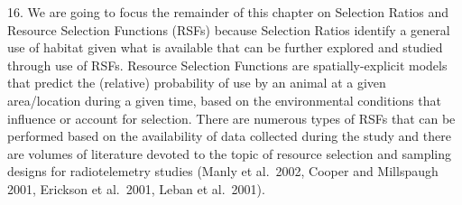 \documentclass[
  letterpaper,
]{book}
\newenvironment{Shaded}{\begin{snugshade}}{\end{snugshade}}
\newcommand{\CommentTok}[1]{\textcolor[rgb]{0.37,0.37,0.37}{#1}}
\newcommand{\DecValTok}[1]{\textcolor[rgb]{0.68,0.00,0.00}{#1}}
\newcommand{\FunctionTok}[1]{\textcolor[rgb]{0.28,0.35,0.67}{#1}}
\newcommand{\NormalTok}[1]{\textcolor[rgb]{0.00,0.23,0.31}{#1}}
\newcommand{\OtherTok}[1]{\textcolor[rgb]{0.00,0.23,0.31}{#1}}
\newcommand{\SpecialCharTok}[1]{\textcolor[rgb]{0.37,0.37,0.37}{#1}}
\newcommand{\StringTok}[1]{\textcolor[rgb]{0.13,0.47,0.30}{#1}}
\begin{document}
\begin{Shaded}
\end{Shaded}

16. We are going to focus the remainder of this chapter on Selection
Ratios and Resource Selection Functions (RSFs) because Selection Ratios
identify a general use of habitat given what is available that can be
further explored and studied through use of RSFs. Resource Selection
Functions are spatially-explicit models that predict the (relative)
probability of use by an animal at a given area/location during a given
time, based on the environmental conditions that influence or account
for selection. There are numerous types of RSFs that can be performed
based on the availability of data collected during the study and there
are volumes of literature devoted to the topic of resource selection and
sampling designs for radiotelemetry studies (Manly et al.~2002, Cooper
and Millspaugh 2001, Erickson et al.~2001, Leban et al.~2001).
\end{document}
